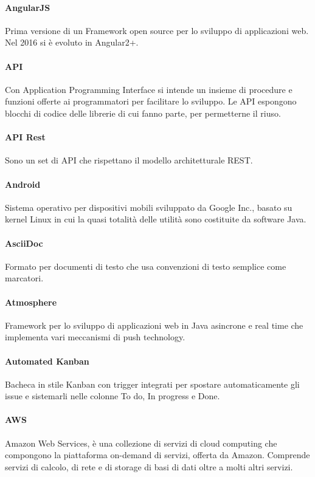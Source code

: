 \documentclass[]{article}
\begin{document}
	\paragraph*{AngularJS}
	Prima versione di un Framework open source per lo sviluppo di applicazioni web. Nel 2016 si è evoluto in Angular2+.

	\paragraph*{API}
	Con Application Programming Interface si intende un insieme di procedure e funzioni offerte ai programmatori per facilitare lo sviluppo. Le API espongono blocchi di codice delle librerie di cui fanno parte, per permetterne il riuso.

	\paragraph*{API Rest}
	Sono un set di API che rispettano il modello architetturale REST.

	\paragraph*{Android}
	Sistema operativo per dispositivi mobili sviluppato da Google Inc., basato su kernel Linux in cui la quasi totalità delle utilità sono costituite da software Java.
	
	\paragraph*{AsciiDoc}
	Formato per documenti di testo che usa convenzioni di testo semplice come marcatori.

	\paragraph*{Atmosphere}
	Framework per lo sviluppo di applicazioni web in Java asincrone e real time che implementa vari meccanismi di push technology.

	\paragraph*{Automated Kanban}
	Bacheca in stile Kanban con trigger integrati per spostare automaticamente gli issue e sistemarli nelle colonne To do, In progress e Done.

	\paragraph*{AWS}
	Amazon Web Services, è una collezione di servizi di cloud computing che compongono la piattaforma on-demand di servizi, offerta da Amazon.	Comprende servizi di calcolo, di rete e di storage di basi di dati oltre a molti altri servizi.
\end{document}
